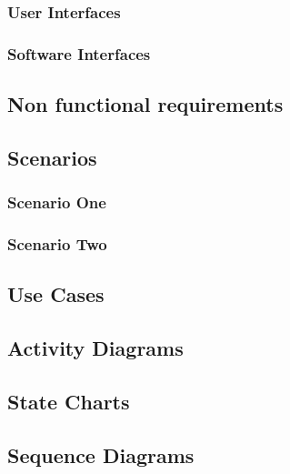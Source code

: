 \documentclass{article}
\begin{document}
\subsubsection{User Interfaces}


\clearpage
\subsubsection{Software Interfaces}


\subsection{Non functional requirements}


\subsection{Scenarios}

\subsubsection{Scenario One}


\clearpage
\subsubsection{Scenario Two}


\clearpage
\subsection{Use Cases}



\clearpage
\subsection{Activity Diagrams}


\clearpage
\subsection{State Charts}


\clearpage
\subsection{Sequence Diagrams}

\end{document}
